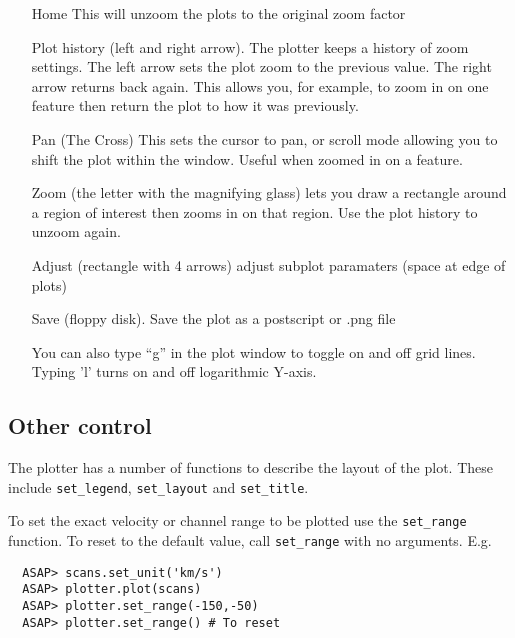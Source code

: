 \documentclass[11pt]{article}
\newcommand{\cmd}[1]{{\tt #1}}
\begin{document}
\begin{itemize}

\item[Home] This will unzoom the plots to the original zoom factor

\item[Plot history] (left and right arrow). The plotter keeps a
history of zoom settings. The left arrow sets the plot zoom to the
previous value. The right arrow returns back again. This allows you,
for example, to zoom in on one feature then return the plot to how it
was previously.

\item[Pan] (The Cross) This sets the cursor to pan, or scroll mode
  allowing you to shift the plot within the window. Useful when
  zoomed in on a feature.

\item[Zoom] (the letter with the magnifying glass) lets you draw a
  rectangle around a region of interest then zooms in on that
  region. Use the plot history to unzoom again.

\item[Adjust] (rectangle with 4 arrows) adjust subplot paramaters
  (space at edge of plots)

\item[Save] (floppy disk). Save the plot as a postscript or .png file

You can also type ``g'' in the plot window to toggle on and off grid
lines. Typing 'l' turns on and off logarithmic Y-axis.

\end{itemize}

\subsection{Other control}

The plotter has a number of functions to describe the layout of the
plot. These include \cmd{set\_legend}, \cmd{set\_layout} and \cmd{set\_title}.

To set the exact velocity or channel range to be plotted use the
\cmd{set\_range} function. To reset to the default value, call
\cmd{set\_range} with no arguments. E.g.

\begin{verbatim}
  ASAP> scans.set_unit('km/s')
  ASAP> plotter.plot(scans)
  ASAP> plotter.set_range(-150,-50)
  ASAP> plotter.set_range() # To reset
\end{verbatim}
\end{document}
